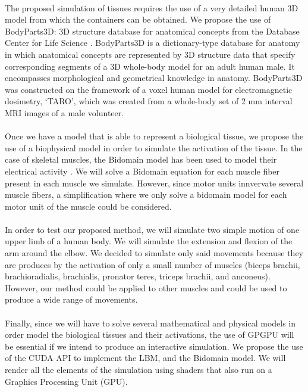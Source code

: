 \paragraph{}The proposed simulation of tissues requires the use of a very detailed human 3D model from which the containers can be obtained. We propose the use of BodyParts3D: 3D structure database for anatomical concepts \citep{mitsuhashi2009bodyparts3d} from the Database Center for Life Science \citep{DBCLS}. BodyParts3D is a dictionary-type database for anatomy in which anatomical concepts are represented by 3D structure data that specify corresponding segments of a 3D whole-body model for an adult human male. It encompasses morphological and geometrical knowledge in anatomy. BodyParts3D was constructed on the framework of a voxel human model for electromagnetic dosimetry, ‘TARO’, which was created from a whole-body set of 2 mm interval MRI images of a male volunteer.

\paragraph{}Once we have a model that is able to represent a biological tissue, we propose the use of a biophysical model in order to simulate the activation of the tissue. In the case of skeletal muscles, the Bidomain model has been used to model their electrical activity \citep{rohrle2012physiologically}. We will solve a Bidomain equation for each muscle fiber present in each muscle we simulate. However, since motor units innvervate several muscle fibers, a simplification where we only solve a bidomain model for each motor unit of the muscle could be considered.

\paragraph{}In order to test our proposed method, we will simulate two simple motion of one upper limb of a human body. We will simulate the extension and flexion of the arm around the elbow. We decided to simulate only said movements because they are produces by the activation of only a small number of muscles (biceps brachii, brachioradialis, brachialis, pronator teres, triceps brachii, and anconeus). However, our method could be applied to other muscles and could be used to produce a wide range of movements. 

\paragraph{}Finally, since we will have to solve several mathematical and physical models in order model the biological tissues and their activations, the use of GPGPU will be essential if we intend to produce an interactive simulation. We propose the use of the CUDA API to implement the LBM, and the Bidomain model. We will render all the elements of the simulation using shaders that also run on a Graphics Processing Unit (GPU). 














